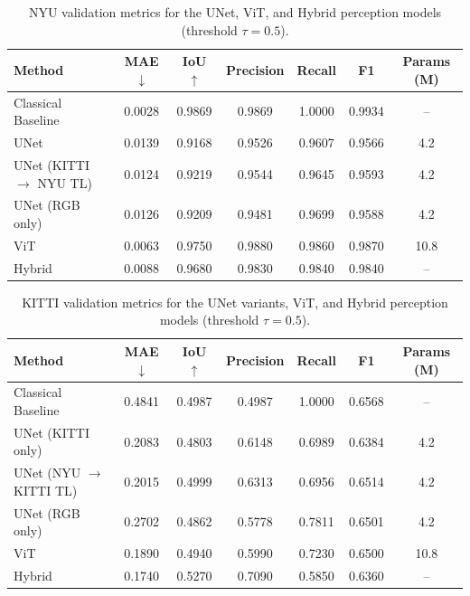 \begin{table}[H]
  \centering
  \caption{NYU validation metrics for the UNet, ViT, and Hybrid perception models (threshold $\tau={}0.5$).}
  \label{tab:nyu_results}
  \begin{tabular}{lcccccc}
    \toprule
    Method & MAE $\downarrow$ & IoU $\uparrow$ & Precision & Recall & F1 & Params (M) \\ 
    \midrule
    Classical Baseline & 0.0028 & 0.9869 & 0.9869 & 1.0000 & 0.9934 & -- \\
    UNet & 0.0139 & 0.9168 & 0.9526 & 0.9607 & 0.9566 & 4.2 \\
    UNet (KITTI $\rightarrow$ NYU TL) & 0.0124 & 0.9219 & 0.9544 & 0.9645 & 0.9593 & 4.2 \\
    UNet (RGB only) & 0.0126 & 0.9209 & 0.9481 & 0.9699 & 0.9588 & 4.2 \\
    ViT & 0.0063 & 0.9750 & 0.9880 & 0.9860 & 0.9870 & 10.8 \\
    Hybrid & 0.0088 & 0.9680 & 0.9830 & 0.9840 & 0.9840 & -- \\
    \bottomrule
  \end{tabular}
\end{table}





\begin{table}[H]
  \centering
  \caption{KITTI validation metrics for the UNet variants, ViT, and Hybrid perception models (threshold $\tau={}0.5$).}
  \label{tab:kitti_results}
  \begin{tabular}{lcccccc}
    \toprule
    Method & MAE $\downarrow$ & IoU $\uparrow$ & Precision & Recall & F1 & Params (M) \\ 
    \midrule
    Classical Baseline & 0.4841 & 0.4987 & 0.4987 & 1.0000 & 0.6568 & -- \\
    UNet (KITTI only) & 0.2083 & 0.4803 & 0.6148 & 0.6989 & 0.6384 & 4.2 \\
    UNet (NYU $\rightarrow$ KITTI TL) & 0.2015 & 0.4999 & 0.6313 & 0.6956 & 0.6514 & 4.2 \\
    UNet (RGB only) & 0.2702 & 0.4862 & 0.5778 & 0.7811 & 0.6501 & 4.2 \\
    ViT & 0.1890 & 0.4940 & 0.5990 & 0.7230 & 0.6500 & 10.8 \\
    Hybrid & 0.1740 & 0.5270 & 0.7090 & 0.5850 & 0.6360 & -- \\
    \bottomrule
  \end{tabular}
\end{table}

